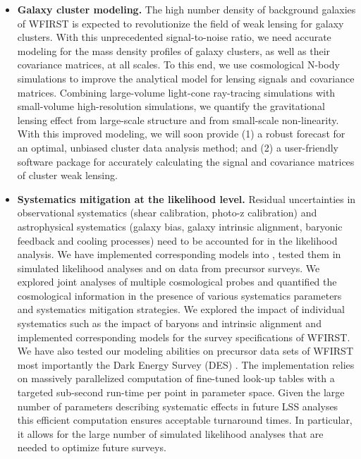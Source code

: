 \begin{itemize}
\item {\bf Galaxy cluster modeling.} The high number density of background galaxies of WFIRST is expected to revolutionize the field of weak lensing for galaxy clusters.  With this unprecedented signal-to-noise ratio, we need accurate modeling for the mass density profiles of galaxy clusters, as well as their covariance matrices, at all scales. To this end, we use cosmological N-body simulations to improve the analytical model for lensing signals and covariance matrices.  Combining large-volume light-cone ray-tracing simulations with small-volume high-resolution simulations, we quantify the gravitational lensing effect from large-scale structure and from small-scale non-linearity. With this improved modeling, we will soon provide (1) a robust forecast for an optimal, unbiased cluster data analysis method; and (2) a user-friendly software package for accurately calculating the signal and covariance matrices of cluster weak lensing.

\item {\bf Systematics mitigation at the likelihood level.} Residual uncertainties in observational systematics (shear calibration, photo-z calibration) and astrophysical systematics (galaxy bias, galaxy intrinsic alignment, baryonic feedback and cooling processes) need to be accounted for in the likelihood analysis. We have implemented corresponding models into \CoLi, tested them in simulated likelihood analyses and on data from precursor surveys. We explored joint analyses of multiple cosmological probes \citep{Krause17,ske17} and quantified the cosmological information in the presence of various systematics parameters and systematics mitigation strategies. We explored the impact of individual systematics such as the impact of baryons and intrinsic alignment \citep{ekd15, keb16,hem18} and implemented corresponding models for the survey specifications of WFIRST. We have also tested our modeling abilities on precursor data sets of WFIRST most importantly the Dark Energy Survey (DES) \citep{kez17, DES17}. The implementation relies on massively parallelized computation of fine-tuned look-up tables with a targeted sub-second run-time per point in parameter space. Given the large number of parameters describing systematic effects in future LSS analyses this efficient computation ensures acceptable turnaround times. In particular, it allows for the large number of simulated likelihood analyses that are needed to optimize future surveys.

\end{itemize}


